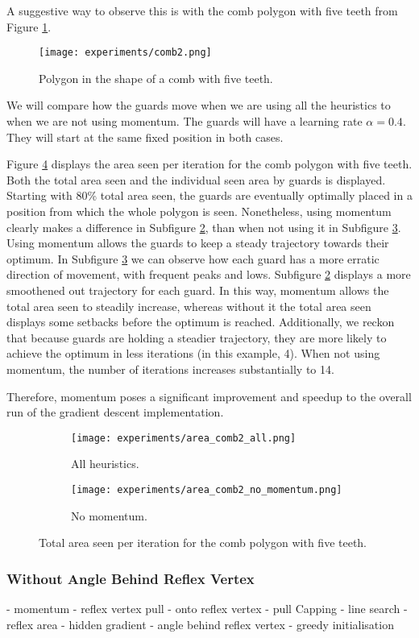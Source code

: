 A suggestive way to observe this is with the comb polygon with five teeth from Figure \ref{fig:comb2}.

\begin{figure}[h!]
    \centering
    \texttt{[image: experiments/comb2.png]}
    \caption{Polygon in the shape of a comb with five teeth.}
    \label{fig:comb2}
\end{figure}

We will compare how the guards move when we are using all the heuristics to when we are not using momentum. The guards will have a learning rate $\alpha = 0.4$. They will start at the same fixed position in both cases.

Figure \ref{fig:no_momentum} displays the area seen per iteration for the comb polygon with five teeth. Both the total area seen and the individual seen area by guards is displayed. Starting with 80\% total area seen, the guards are eventually optimally placed in a position from which the whole polygon is seen. Nonetheless, using momentum clearly makes a difference in Subfigure \ref{fig:no_momentum1}, than when not using it in Subfigure \ref{fig:no_momentum2}. Using momentum allows the guards to keep a steady trajectory towards their optimum. In Subfigure \ref{fig:no_momentum2} we can observe how each guard has a more erratic direction of movement, with frequent peaks and lows. Subfigure \ref{fig:no_momentum1} displays a more smoothened out trajectory for each guard. In this way, momentum allows the total area seen to steadily increase, whereas without it the total area seen displays some setbacks before the optimum is reached.
Additionally, we reckon that because guards are holding a steadier trajectory, they are more likely to achieve the optimum in less iterations (in this example, 4). When not using momentum, the number of iterations increases substantially to 14.

Therefore, momentum poses a significant improvement and speedup to the overall run of the gradient descent implementation.

\begin{figure}[h!]
    \centering
    \begin{subfigure}{0.45\textwidth}
        \texttt{[image: experiments/area\_comb2\_all.png]}
        \caption{All heuristics.}
        \label{fig:no_momentum1}
    \end{subfigure}
    \begin{subfigure}{0.45\textwidth}
        \texttt{[image: experiments/area\_comb2\_no\_momentum.png]}
        \caption{No momentum.}
        \label{fig:no_momentum2}
    \end{subfigure}
    \caption{Total area seen per iteration for the comb polygon with five teeth.}
    \label{fig:no_momentum}
\end{figure}

\subsubsection{Without Angle Behind Reflex Vertex}

- momentum
- reflex vertex pull
    - onto reflex vertex
    - pull Capping
- line search
- reflex area
- hidden gradient
- angle behind reflex vertex
- greedy initialisation